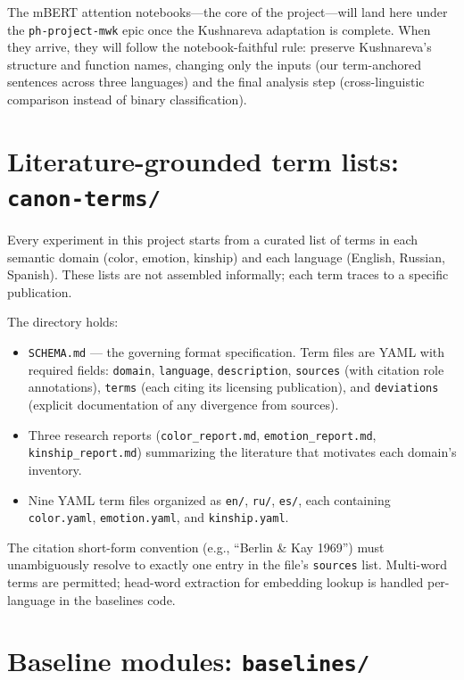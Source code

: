 The mBERT attention notebooks---the core of the project---will land here under the \texttt{ph-project-mwk} epic once the Kushnareva adaptation is complete. When they arrive, they will follow the notebook-faithful rule: preserve Kushnareva's structure and function names, changing only the inputs (our term-anchored sentences across three languages) and the final analysis step (cross-linguistic comparison instead of binary classification).

\section{Literature-grounded term lists: \texttt{canon-terms/}}
\label{sec:canon-terms}

Every experiment in this project starts from a curated list of terms in each semantic domain (color, emotion, kinship) and each language (English, Russian, Spanish). These lists are not assembled informally; each term traces to a specific publication.

The directory holds:

\begin{itemize}
  \item \texttt{SCHEMA.md} --- the governing format specification. Term files are YAML with required fields: \texttt{domain}, \texttt{language}, \texttt{description}, \texttt{sources} (with citation role annotations), \texttt{terms} (each citing its licensing publication), and \texttt{deviations} (explicit documentation of any divergence from sources).
  \item Three research reports (\texttt{color\_report.md}, \texttt{emotion\_report.md}, \texttt{kinship\_report.md}) summarizing the literature that motivates each domain's inventory.
  \item Nine YAML term files organized as \texttt{en/}, \texttt{ru/}, \texttt{es/}, each containing \texttt{color.yaml}, \texttt{emotion.yaml}, and \texttt{kinship.yaml}.
\end{itemize}

The citation short-form convention (e.g., ``Berlin \& Kay 1969'') must unambiguously resolve to exactly one entry in the file's \texttt{sources} list. Multi-word terms are permitted; head-word extraction for embedding lookup is handled per-language in the baselines code.

\section{Baseline modules: \texttt{baselines/}}
\label{sec:baselines}

